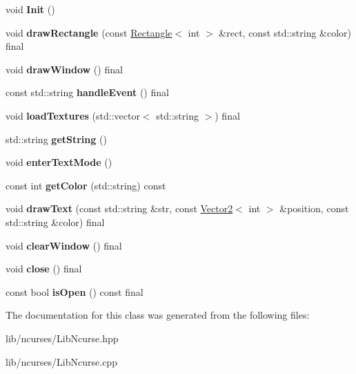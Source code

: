 \begin{DoxyCompactItemize}
\item 
\mbox{\label{class_lib_ncurse_a902000326da1191a5a9ec01f576fefbe}} 
void {\bfseries Init} ()
\item 
\mbox{\label{class_lib_ncurse_a4df45ee61d2979f449f5d76997a6afb4}} 
void {\bfseries draw\+Rectangle} (const \hyperlink{struct_rectangle}{Rectangle}$<$ int $>$ \&rect, const std\+::string \&color) final
\item 
\mbox{\label{class_lib_ncurse_a79d59d86d893ccecbf3cd2c17f7ff538}} 
void {\bfseries draw\+Window} () final
\item 
\mbox{\label{class_lib_ncurse_abb8a827f8529d331dfcb2cae28dc1358}} 
const std\+::string {\bfseries handle\+Event} () final
\item 
\mbox{\label{class_lib_ncurse_a612535eaae922d0c42ab3f3ed5ffc10c}} 
void {\bfseries load\+Textures} (std\+::vector$<$ std\+::string $>$) final
\item 
\mbox{\label{class_lib_ncurse_a75aea5747954e458b997146a5cc83705}} 
std\+::string {\bfseries get\+String} ()
\item 
\mbox{\label{class_lib_ncurse_af5952c8c4e13f59ac701d91e50e1c7e6}} 
void {\bfseries enter\+Text\+Mode} ()
\item 
\mbox{\label{class_lib_ncurse_aa587f9bf27b087297bd346da6c8044d1}} 
const int {\bfseries get\+Color} (std\+::string) const
\item 
\mbox{\label{class_lib_ncurse_aba1b05011ddaf8f889951aecd2908301}} 
void {\bfseries draw\+Text} (const std\+::string \&str, const \hyperlink{struct_vector2}{Vector2}$<$ int $>$ \&position, const std\+::string \&color) final
\item 
\mbox{\label{class_lib_ncurse_a624e99b020c70f610afa53f3435d05d9}} 
void {\bfseries clear\+Window} () final
\item 
\mbox{\label{class_lib_ncurse_aab5802cbe2362f2dac726aafb7035373}} 
void {\bfseries close} () final
\item 
\mbox{\label{class_lib_ncurse_ad3389ed9b5cc782c7dbda5f96cdce2ce}} 
const bool {\bfseries is\+Open} () const final
\end{DoxyCompactItemize}


The documentation for this class was generated from the following files\+:\begin{DoxyCompactItemize}
\item 
lib/ncurses/Lib\+Ncurse.\+hpp\item 
lib/ncurses/Lib\+Ncurse.\+cpp\end{DoxyCompactItemize}
